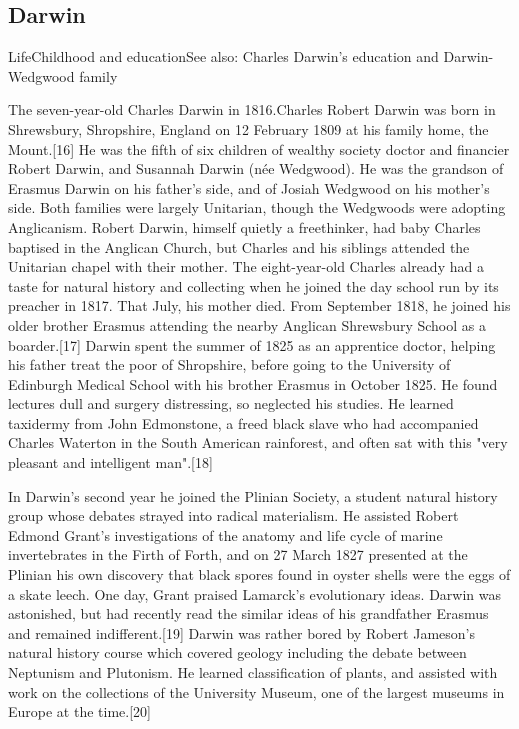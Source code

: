 \documentclass{article}
\begin{document}
\hdashrule[0.5ex][x]{3in}{2pt}{2cm 0pt}

\subsection{Darwin}
LifeChildhood and educationSee also: Charles Darwin's education and Darwin-Wedgwood family
 
The seven-year-old Charles Darwin in 1816.Charles Robert Darwin was born in Shrewsbury, Shropshire, England on 12 February 1809 at his family home, the Mount.[16] He was the fifth of six children of wealthy society doctor and financier Robert Darwin, and Susannah Darwin (née Wedgwood). He was the grandson of Erasmus Darwin on his father's side, and of Josiah Wedgwood on his mother's side. Both families were largely Unitarian, though the Wedgwoods were adopting Anglicanism. Robert Darwin, himself quietly a freethinker, had baby Charles baptised in the Anglican Church, but Charles and his siblings attended the Unitarian chapel with their mother. The eight-year-old Charles already had a taste for natural history and collecting when he joined the day school run by its preacher in 1817. That July, his mother died. From September 1818, he joined his older brother Erasmus attending the nearby Anglican Shrewsbury School as a boarder.[17]
Darwin spent the summer of 1825 as an apprentice doctor, helping his father treat the poor of Shropshire, before going to the University of Edinburgh Medical School with his brother Erasmus in October 1825. He found lectures dull and surgery distressing, so neglected his studies. He learned taxidermy from John Edmonstone, a freed black slave who had accompanied Charles Waterton in the South American rainforest, and often sat with this "very pleasant and intelligent man".[18]

In Darwin's second year he joined the Plinian Society, a student natural history group whose debates strayed into radical materialism. He assisted Robert Edmond Grant's investigations of the anatomy and life cycle of marine invertebrates in the Firth of Forth, and on 27 March 1827 presented at the Plinian his own discovery that black spores found in oyster shells were the eggs of a skate leech. One day, Grant praised Lamarck's evolutionary ideas. Darwin was astonished, but had recently read the similar ideas of his grandfather Erasmus and remained indifferent.[19] Darwin was rather bored by Robert Jameson's natural history course which covered geology including the debate between Neptunism and Plutonism. He learned classification of plants, and assisted with work on the collections of the University Museum, one of the largest museums in Europe at the time.[20]
\end{document}
